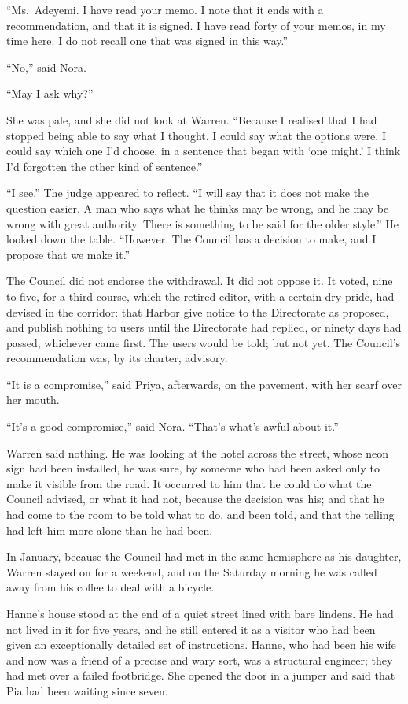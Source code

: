 ``Ms.~Adeyemi. I have read your memo. I note that it ends with a recommendation, and that it is signed. I have read forty of your memos, in my time here. I do not recall one that was signed in this way.''

``No,'' said Nora.

``May I ask why?''

She was pale, and she did not look at Warren. ``Because I realised that I had stopped being able to say what I thought. I could say what the options were. I could say which one I'd choose, in a sentence that began with `one might.' I think I'd forgotten the other kind of sentence.''

``I see.'' The judge appeared to reflect. ``I will say that it does not make the question easier. A man who says what he thinks may be wrong, and he may be wrong with great authority. There is something to be said for the older style.'' He looked down the table. ``However. The Council has a decision to make, and I propose that we make it.''

The Council did not endorse the withdrawal. It did not oppose it. It voted, nine to five, for a third course, which the retired editor, with a certain dry pride, had devised in the corridor: that Harbor give notice to the Directorate as proposed, and publish nothing to users until the Directorate had replied, or ninety days had passed, whichever came first. The users would be told; but not yet. The Council's recommendation was, by its charter, advisory.

``It is a compromise,'' said Priya, afterwards, on the pavement, with her scarf over her mouth.

``It's a good compromise,'' said Nora. ``That's what's awful about it.''

Warren said nothing. He was looking at the hotel across the street, whose neon sign had been installed, he was sure, by someone who had been asked only to make it visible from the road. It occurred to him that he could do what the Council advised, or what it had not, because the decision was his; and that he had come to the room to be told what to do, and been told, and that the telling had left him more alone than he had been.

\scenebreak
\noindent In January, because the Council had met in the same hemisphere as his daughter, Warren stayed on for a weekend, and on the Saturday morning he was called away from his coffee to deal with a bicycle.

Hanne's house stood at the end of a quiet street lined with bare lindens. He had not lived in it for five years, and he still entered it as a visitor who had been given an exceptionally detailed set of instructions. Hanne, who had been his wife and now was a friend of a precise and wary sort, was a structural engineer; they had met over a failed footbridge. She opened the door in a jumper and said that Pia had been waiting since seven.


